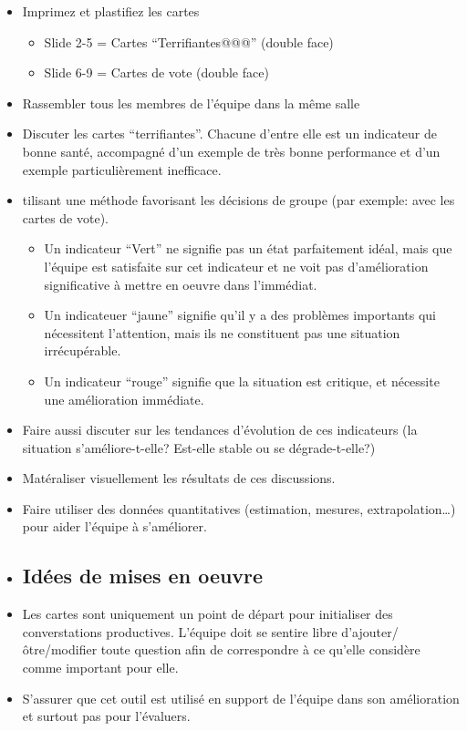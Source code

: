 \begin{itemize}
\item Imprimez et plastifiez les cartes


\begin{itemize}
\item Slide 2-5 = Cartes ``Terrifiantes@@@'' (double face)
\item Slide 6-9 = Cartes de vote (double face)
\end{itemize}
\item Rassembler tous les membres de l'équipe dans la même salle
\item Discuter les cartes ``terrifiantes''. Chacune d'entre elle est un indicateur de bonne santé, accompagné d'un exemple de très bonne performance et d'un exemple particulièrement inefficace.
\item tilisant une méthode favorisant les décisions de groupe (par exemple: avec les cartes de vote).


\begin{itemize}
\item Un indicateur ``Vert'' ne signifie pas un état parfaitement idéal, mais que l'équipe est satisfaite sur cet indicateur et ne voit pas d'amélioration significative à mettre en oeuvre dans l'immédiat.
\item Un indicateuer ``jaune'' signifie qu'il y a des problèmes importants qui nécessitent l'attention, mais ils ne constituent pas une situation irrécupérable.
\item Un indicateur ``rouge'' signifie que la situation est critique, et nécessite une amélioration immédiate.
\end{itemize}
\item Faire aussi discuter sur les tendances d'évolution de ces indicateurs (la situation s'améliore-t-elle? Est-elle stable ou se dégrade-t-elle?)
\item Matéraliser visuellement les résultats de ces discussions.
\item Faire utiliser des données quantitatives (estimation, mesures, extrapolation\ldots{}) pour aider l'équipe à s'améliorer.
\item \subsection{Idées de mises en oeuvre}\hypertarget{ides-de-mises-en-oeuvre}{}\label{ides-de-mises-en-oeuvre}
\item Les cartes sont uniquement un point de départ pour initialiser des converstations productives. L'équipe doit se sentire libre d'ajouter/ôtre/modifier toute question afin de correspondre à ce qu'elle considère comme important pour elle.
\item S'assurer que cet outil est utilisé en support de l'équipe dans son amélioration et surtout pas pour l'évaluers.
\end{itemize}

